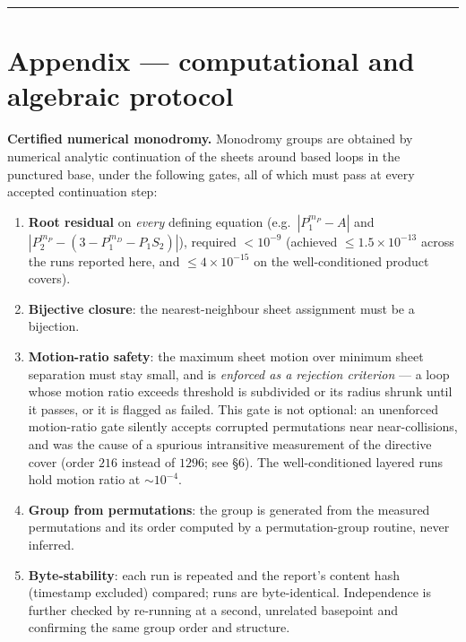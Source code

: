 \documentclass[11pt]{article}
\providecommand{\tightlist}{\setlength{\itemsep}{0pt}\setlength{\parskip}{0pt}}
\theoremstyle{plain}
\theoremstyle{definition}
\theoremstyle{remark}
\begin{document}
\begin{center}\rule{0.5\linewidth}{0.5pt}\end{center}

\hypertarget{appendix-computational-and-algebraic-protocol}{%
\section*{Appendix --- computational and algebraic protocol}\label{appendix-computational-and-algebraic-protocol}}

\textbf{Certified numerical monodromy.} Monodromy groups are obtained by numerical analytic continuation of the sheets around based loops in the punctured base, under the following gates, all of which must pass at every accepted continuation step:

\begin{enumerate}
\def\labelenumi{\arabic{enumi}.}
\tightlist
\item
  \textbf{Root residual} on \emph{every} defining equation (e.g.~\(|P_1^{m_P} - A|\) and \(|P_2^{m_P} - (3 - P_1^{m_D} - P_1 S_2)|\)), required \(< 10^{-9}\) (achieved \(\le 1.5\times 10^{-13}\) across the runs reported here, and \(\le 4\times 10^{-15}\) on the well-conditioned product covers).
\item
  \textbf{Bijective closure}: the nearest-neighbour sheet assignment must be a bijection.
\item
  \textbf{Motion-ratio safety}: the maximum sheet motion over minimum sheet separation must stay small, and is \emph{enforced as a rejection criterion} --- a loop whose motion ratio exceeds threshold is subdivided or its radius shrunk until it passes, or it is flagged as failed. This gate is not optional: an unenforced motion-ratio gate silently accepts corrupted permutations near near-collisions, and was the cause of a spurious intransitive measurement of the directive cover (order \(216\) instead of \(1296\); see §6). The well-conditioned layered runs hold motion ratio at \(\sim 10^{-4}\).
\item
  \textbf{Group from permutations}: the group is generated from the measured permutations and its order computed by a permutation-group routine, never inferred.
\item
  \textbf{Byte-stability}: each run is repeated and the report's content hash (timestamp excluded) compared; runs are byte-identical. Independence is further checked by re-running at a second, unrelated basepoint and confirming the same group order and structure.
\end{enumerate}
\end{document}
